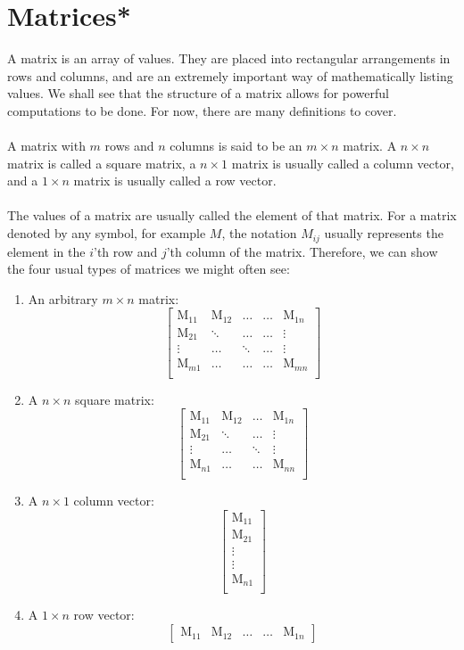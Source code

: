 \section{Matrices*}
A matrix is an array of values. They are placed into rectangular arrangements in rows and columns, and are an extremely important way of mathematically listing values. We shall see that the structure of a matrix allows for powerful computations to be done. For now, there are many definitions to cover.
\\\\
A matrix with $m$ rows and $n$ columns is said to be an $m\times n$ matrix. A $n\times n$ matrix is called a square matrix, a $n\times 1$ matrix is usually called a column vector, and a $1\times n$ matrix is usually called a row vector. 
\\\\
The values of a matrix are usually called the element of that matrix. For a matrix denoted by any symbol, for example $M$, the notation $M_{ij}$ usually represents the element in the $i$'th row and $j$'th column of the matrix. Therefore, we can show the four usual types of matrices we might often see:
\begin{enumerate}
    \item An arbitrary $m\times n$ matrix:
    $$
    \begin{bmatrix}
        \text{M}_{11} & \text{M}_{12} & \dots &\dots & \text{M}_{1n} \\
        \text{M}_{21} & \ddots & \dots &\dots & \vdots \\
        \vdots & \dots & \ddots & \dots & \vdots \\
        \text{M}_{m1} & \dots & \dots & \dots & \text{M}_{mn} \\
    \end{bmatrix}
    $$
    \item A $n\times n$ square matrix:
    $$
    \begin{bmatrix}
        \text{M}_{11} & \text{M}_{12} & \dots & \text{M}_{1n} \\
        \text{M}_{21} & \ddots & \dots & \vdots \\
        \vdots & \dots & \ddots  & \vdots \\
        \text{M}_{n1} & \dots & \dots & \text{M}_{nn} \\
    \end{bmatrix}
    $$
    \item A $n\times 1$ column vector:
    $$
    \begin{bmatrix}
        \text{M}_{11} \\
        \text{M}_{21} \\
        \vdots \\
        \vdots \\ 
        \text{M}_{n1} \\
    \end{bmatrix}
    $$
    \item A $1\times n$ row vector:
    $$
    \begin{bmatrix}
        \text{M}_{11} &
        \text{M}_{12} &
        \dots &
        \dots &
        \text{M}_{1n} 
    \end{bmatrix}
    $$
\end{enumerate}
